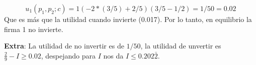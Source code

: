 \documentclass[12pt]{article} %
\begin{document}
\begin{Exercise}[name={Respuesta}]
\begin{enumerate}
          \[
            u_1(p_1, p_2; c) = 1(-2*(3/5) + 2/5)(3/5 - 1/2) = 1/50 = 0.02
          \]
          Que es más que la utilidad cuando invierte (0.017). Por lo tanto, en equilibrio la firma 1 no invierte.
  \end{enumerate}

  \textbf{Extra}: La utilidad de no invertir es de $1/50$, la utilidad de unvertir es $ \frac{2}{9} -I \geq 0.02$, despejando para $ I $ nos da $ I \leq 0.202\bar 2$.

\end{Exercise}
\end{document}
